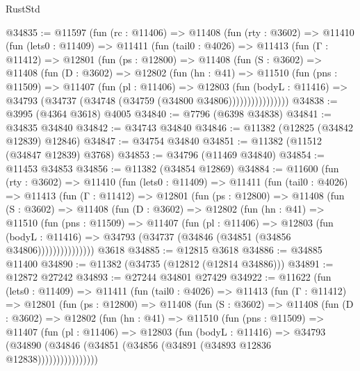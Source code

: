 \begin{lexlean}{RustStd}
\begin{coremodule}
@34835 := @11597
    (fun (rc : @11406) =>
    @11408
      (fun (rty : @3602) =>
      @11410
        (fun (lets0 : @11409) =>
        @11411
          (fun (tail0 : @4026) =>
          @11413
            (fun (Γ : @11412) =>
            @12801
              (fun (ps : @12800) =>
              @11408
                (fun (S : @3602) =>
                @11408
                  (fun (D : @3602) =>
                  @12802
                    (fun (hn : @41) =>
                    @11510
                      (fun (pns : @11509) =>
                      @11407
                        (fun (pl : @11406) =>
                        @12803
                          (fun (bodyL : @11416) =>
                          @34793 (@34737 (@34748 (@34759 (@34800 @34806))))))))))))))))
@34838 := @3995 (@4364 @3618) @4005
@34840 := @7796 (@6398 @34838)
@34841 := @34835 @34840
@34842 := @34743 @34840
@34846 := @11382 (@12825 (@34842 @12839) @12846)
@34847 := @34754 @34840
@34851 := @11382 (@11512 (@34847 @12839) @3768)
@34853 := @34796 (@11469 @34840)
@34854 := @11453 @34853
@34856 := @11382 (@34854 @12869)
@34884 := @11600
    (fun (rty : @3602) =>
    @11410
      (fun (lets0 : @11409) =>
      @11411
        (fun (tail0 : @4026) =>
        @11413
          (fun (Γ : @11412) =>
          @12801
            (fun (ps : @12800) =>
            @11408
              (fun (S : @3602) =>
              @11408
                (fun (D : @3602) =>
                @12802
                  (fun (hn : @41) =>
                  @11510
                    (fun (pns : @11509) =>
                    @11407
                      (fun (pl : @11406) =>
                      @12803
                        (fun (bodyL : @11416) =>
                        @34793 (@34737 (@34846 (@34851 (@34856 @34806)))))))))))))))
    @3618
@34885 := @12815 @3618
@34886 := @34885 @11400
@34890 := @11382 (@34735 (@12812 (@12814 @34886)))
@34891 := @12872 @27242
@34893 := @27244 @34801 @27429
@34922 := @11622
    (fun (lets0 : @11409) =>
    @11411
      (fun (tail0 : @4026) =>
      @11413
        (fun (Γ : @11412) =>
        @12801
          (fun (ps : @12800) =>
          @11408
            (fun (S : @3602) =>
            @11408
              (fun (D : @3602) =>
              @12802
                (fun (hn : @41) =>
                @11510
                  (fun (pns : @11509) =>
                  @11407
                    (fun (pl : @11406) =>
                    @12803
                      (fun (bodyL : @11416) =>
                      @34793
                        (@34890
                          (@34846 (@34851 (@34856 (@34891 (@34893 @12836 @12838))))))))))))))))

\end{coremodule}
\end{lexlean}
